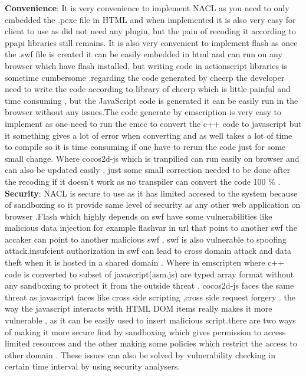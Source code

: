 \documentclass[23pt]{article}
\begin{document}
{\textbf{Convenience}:  It is very convenience to implement NACL as you need to only embedded the .pexe file in HTML and when implemented it is also very easy for client to use as did not need any plugin, but the pain of recoding it according to ppapi libraries still remains. It is also very convenient to implement flash as once the .swf file is created it can be easily embedded in html and can run on any browser which have flash installed, but writing code in actionscript libraries  is sometime cumbersome .regarding the code generated by cheerp the developer need to write the code according to library of cheerp which is little painful and time consuming  , but the JavaScript code is generated it can be easily run in the browser without any issues.The code generate by emscription is very easy to implement as one need to  run the emcc to convert the c++ code to javascript but it something gives a lot of error when converting and as well takes a lot of time to compile so it is time consuming if one have to rerun the code just for some small change. Where cocos2d-js which is tranpilied can run easily on browser and can also be updated easily , just some small correction needed to be done after the recoding if it doesn’t work as no transpiler can convert the code 100 \% . \\
\textbf{Security}: NACL is secure to use as it has limited accesed to the system because of sandboxing so it provide same level of security as any other web application on browser  \cite{comparison}.Flash which highly depends on swf have some vulnerabilities like malicious data injection for example flashvar in url that point to another swf  the accaker can point to another malicious swf , swf is also vulnerable to spoofing attack.insufcient authorization in swf can lead to cross domain attack and data theft when it is hosted in a shared domain \cite{flascsecurity}. Where in emscripten where c++ code is converted to subset of javascript(asm.js) are typed array format without any sandboxing to protect it from the outside threat . cocos2d-js faces the same threat as javascript faces like cross side scripting ,cross side request forgery . the way the javascript interacts with HTML DOM items really makes it more vulnerable , as it can be easily used to insert malicious script.there are two ways of making it more secure first by sandboxing which gives permission to access limited resources and the other making some policies which restrict the access to other domain \cite{javascriptsecurity}. These issues can also be solved by vulnerability checking in certain time interval by using security analysers.  \\
 \par}
\end{document}
